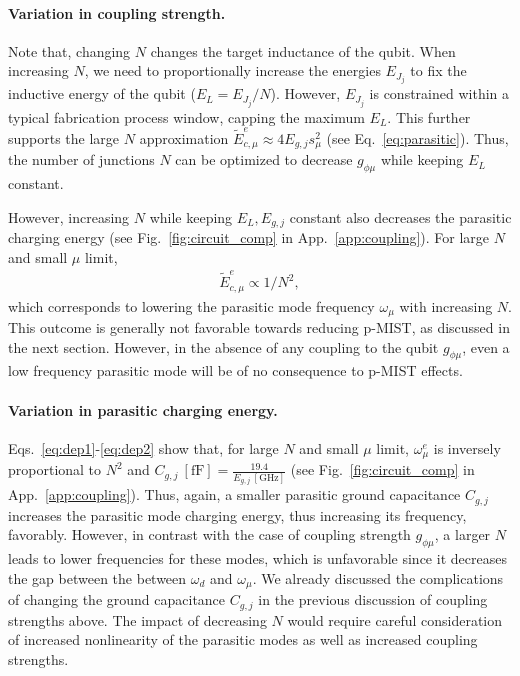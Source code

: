 \documentclass[%
reprint,
superscriptaddress,
 amsmath,amssymb,
 aps,
 prx,
longbibliography,
floatfix,
]{revtex4-2}
\begin{document}
\paragraph{Variation in coupling strength.} Note that, changing $N$ changes the target inductance of the qubit. When increasing $N$, we need to proportionally increase the energies $E_{J_j}$ to fix the inductive energy of the qubit ($E_L=E_{J_j}/N$). However, $E_{J_j}$ is constrained within a typical fabrication process window, capping the maximum $E_{L}$. This further supports the large $N$ approximation $\tilde{E}_{c,\mu}^e\approx 4E_{g,j}s_\mu^2$ (see Eq.~\ref{eq:parasitic}). Thus, the number of junctions $N$ can be optimized to decrease $g_{\phi\mu}$ while keeping $E_L$ constant. 

However, increasing $N$ while keeping $E_L, E_{g,j}$ constant also decreases the parasitic charging energy (see Fig.~\ref{fig:circuit_comp} in App.~\ref{app:coupling}). For large $N$ and small $\mu$ limit,
\begin{align}
\tilde{E}_{c,\mu}^e\propto 1/N^2,  \label{eq:dep2} 
\end{align}
which corresponds to lowering the parasitic mode frequency $\omega_\mu$ with increasing $N$. This outcome is generally not favorable towards reducing p-MIST, as discussed in the next section. However, in the absence of any coupling to the qubit $g_{\phi\mu}$, even a low frequency parasitic mode will be of no consequence to p-MIST effects.

\paragraph{Variation in parasitic charging energy.}  Eqs.~\ref{eq:dep1}-\ref{eq:dep2} show that, for large $N$ and small $\mu$ limit, $\omega_\mu^e$ is inversely proportional to $N^2$ and $C_{g,j} \ \mathrm{[fF]}=\frac{19.4}{E_{g,j} \ \mathrm{[GHz]}}$ (see Fig.~\ref{fig:circuit_comp} in App.~\ref{app:coupling}). Thus, again, a smaller parasitic ground capacitance $C_{g,j}$ increases the parasitic mode charging energy, thus increasing its frequency, favorably. However, in contrast with the case of coupling strength $g_{\phi\mu}$, a larger $N$ leads to lower frequencies for these modes, which is unfavorable since it decreases the gap between the between $\omega_d$ and $\omega_\mu$. We already discussed the complications of changing the ground capacitance $C_{g,j}$ in the previous discussion of coupling strengths above. The impact of decreasing $N$ would require careful consideration of increased nonlinearity of the parasitic modes as well as increased coupling strengths.
\end{document}

